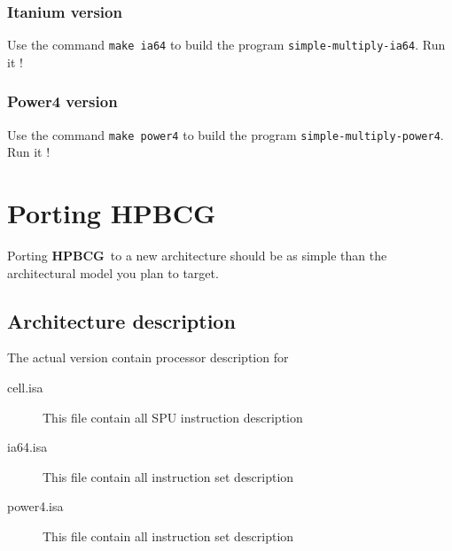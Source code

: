 \documentclass{article}
\newcommand{\hpbcg}{\textbf{HPBCG}\ }
\begin{document}
\subsubsection{Itanium version}

Use the command \texttt{make ia64} to build the program
\texttt{simple-multiply-ia64}. Run it !

\subsubsection{Power4 version}

Use the command \texttt{make power4} to build the program
\texttt{simple-multiply-power4}. Run it !

\section{Porting \hpbcg}

Porting \hpbcg to a new architecture should be as simple than the
architectural model you plan to target.

\subsection{Architecture description}

The actual version contain processor description for 
\begin{description}
\item[cell.isa] This file contain all SPU instruction description
\item[ia64.isa] This file contain all instruction set description
\item[power4.isa] This file contain all instruction set description
\end{description}
\end{document}
